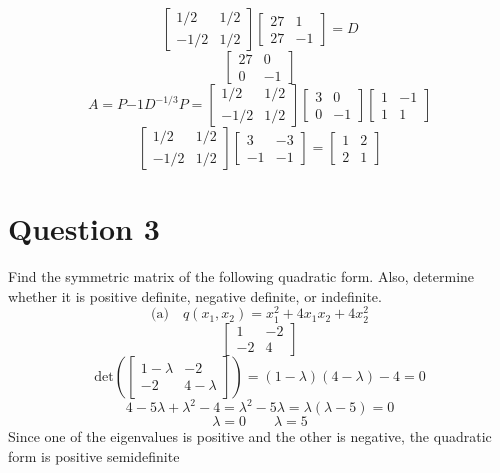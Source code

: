 \documentclass[hidelinks]{article}
\begin{document}
\[	
	\begin{bmatrix} 1/2 & 1/2 \\ -1/2 & 1/2 \end{bmatrix} 	
	\begin{bmatrix} 27 & 1 \\ 27 & -1 \end{bmatrix}	= D
\]
\[	
	\begin{bmatrix} 27 & 0 \\ 0 & -1 \end{bmatrix} 	
\]
\[
	A = P{-1}D^{-1/3}P = 
	\begin{bmatrix} 1/2 & 1/2 \\ -1/2 & 1/2 \end{bmatrix} 		
	\begin{bmatrix} 3 & 0 \\ 0 & -1 \end{bmatrix} 
	\begin{bmatrix} 1 & -1 \\ 1 & 1 \end{bmatrix} 	
\]
\[\begin{bmatrix} 1/2 & 1/2 \\ -1/2 & 1/2 \end{bmatrix} 		
\begin{bmatrix} 3 & -3 \\ -1 & -1 \end{bmatrix} =  
\begin{bmatrix} 1 & 2 \\ 2 & 1 \end{bmatrix}
\]
\newpage
\section{Question 3}
Find the symmetric matrix of the following quadratic form. Also, determine whether it is positive definite, negative definite, or indefinite.
\[
	\text{(a)} \quad q(x_1, x_2) = x_1^2 + 4x_1x_2 + 4x_2^2
\]
\[
	\begin{bmatrix} 1 & -2 \\ -2 & 4 \end{bmatrix} 
\]
\[
	\text{det}(\begin{bmatrix} 1 - \lambda & -2 \\ -2 & 4 - \lambda \end{bmatrix}) = (1-\lambda)(4-\lambda) - 4 = 0
\]
\[
	4 - 5\lambda + \lambda^2 - 4 = \lambda^2 - 5\lambda = \lambda(\lambda - 5) = 0
\]
\[
	\lambda = 0 \quad \quad \lambda = 5
\]
Since one of the eigenvalues is positive and the other is negative, the quadratic form is positive semidefinite
\end{document}
